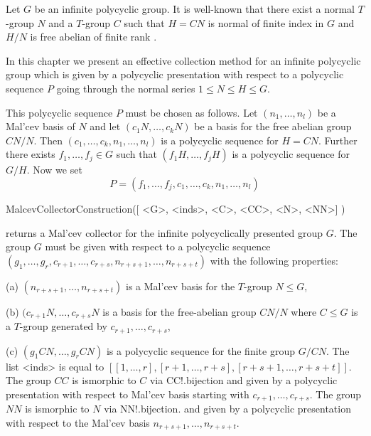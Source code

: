 

Let $G$ be an infinite polycyclic group. It is well-known that
there exist  a normal
${T}$-group $N$ and a ${T}$-group $C$ such that $H=CN$ is normal
of finite
index in $G$ and  $H/N$ is free abelian of finite rank \cite{Seg83}. 

In this chapter
we present an effective collection method for an infinite
polycyclic group which is given by a polycyclic presentation 
with respect
to a polycyclic sequence $P$ going through the normal
series $1 \le N \le H \le G$.

This polycyclic sequence $P$ must be chosen as follows.
Let $(n_1,\dots,n_l)$ be a Mal'cev basis of $N$ and let
$(c_1N,\dots,c_k N)$ be a basis for
the free abelian group $CN/N$.
Then $(c_1,\dots,c_k,n_1,\dots,n_l)$
is a polycyclic sequence for $H=CN$. Further there exists
$f_1,\dots, f_j \in G$ such that $(f_1 H, \dots, f_j H)$ is
a polycyclic sequence for $G/H$. Now we set
$$P = (f_1,\dots,f_j, c_1, \dots , c_k, n_1, \dots, n_l )$$


\> MalcevCollectorConstruction([ <G>, <inds>, <C>, <CC>, <N>, <NN>] )

returns a Mal'cev collector for the infinite polycyclically presented group 
$G$. The group $G$ must be given with respect to a polycyclic sequence 
$(g_1,\dots,g_r, c_{r+1}, \dots, c_{r+s}, n_{r+s+1}, \dots, n_{r+s+t})$
with the following properties:
\beginlist
\item{(a)}
$(n_{r+s+1}, \dots, n_{r+s+t})$ is a Mal'cev basis for the $T$-group 
$N \leq G$,
\item{(b)}  $(c_{r+1}N, \dots, c_{r+s}N$ is a basis for the 
free-abelian group $CN/N$ where $C \leq G$ is a $T$-group generated by 
$ c_{r+1}, \dots, c_{r+s} $, 
\item{(c)}
$(g_1 CN, \dots, g_r CN)$ is a polycyclic sequence for the finite
group $G/CN$.
\endlist 
The list <inds> is equal to 
$[ [1,\dots,r],[r+1,\dots,r+s],[r+s+1,\dots,r+s+t]]$. 
The group $CC$ is ismorphic to $C$ via CC!.bijection 
and given by a polycyclic presentation with respect 
to Mal'cev basis starting with $ c_{r+1}, \dots, c_{r+s}$.
The  group $NN$ is ismorphic to $N$ via NN!.bijection.
and given by a polycyclic presentation with respect 
to the Mal'cev basis $ n_{r+s+1}, \dots, n_{r+s+t}$.

